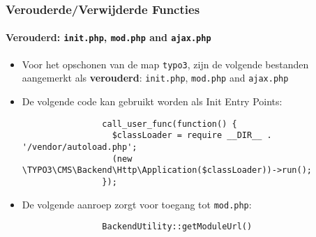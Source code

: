 \begin{frame}[fragile]
	\frametitle{Verouderde/Verwijderde Functies}
	\framesubtitle{Verouderd: \texttt{init.php}, \texttt{mod.php} and \texttt{ajax.php}}


	\begin{itemize}

		\item Voor het opschonen van de map \texttt{typo3}, zijn de volgende bestanden aangemerkt
			als \textbf{verouderd}: \texttt{init.php}, \texttt{mod.php} and \texttt{ajax.php}

		\item De volgende code kan gebruikt worden als Init Entry Points:

			\begin{lstlisting}
				call_user_func(function() {
				  $classLoader = require __DIR__ . '/vendor/autoload.php';
				  (new \TYPO3\CMS\Backend\Http\Application($classLoader))->run();
				});
			\end{lstlisting}

		\item De volgende aanroep zorgt voor toegang tot \texttt{mod.php}:

			\begin{lstlisting}
				BackendUtility::getModuleUrl()
			\end{lstlisting}

	\end{itemize}

\end{frame}


